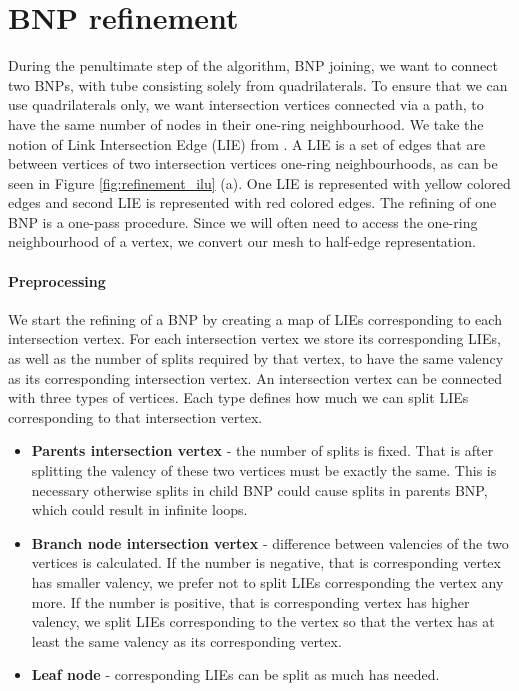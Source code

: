 \section{BNP refinement}\label{sec:bnp_sub}
During the penultimate step of the algorithm, BNP joining, we want to connect two BNPs, with tube consisting solely from quadrilaterals. To ensure that we can use quadrilaterals only, we want intersection vertices connected via a path, to have the same number of nodes in their one-ring neighbourhood. We take the notion of Link Intersection Edge (LIE) from \cite{sqm}. A LIE is a set of edges that are between vertices of two intersection vertices one-ring neighbourhoods, as can be seen in Figure \ref{fig:refinement_ilu} (a). One LIE is represented with yellow colored edges and second LIE is represented with red colored edges. The refining of one BNP is a one-pass procedure. Since we will often need to access the one-ring neighbourhood of a vertex, we convert our mesh to half-edge representation.

\paragraph{Preprocessing}
We start the refining of a BNP by creating a map of LIEs corresponding to each intersection vertex. For each intersection vertex we store its corresponding LIEs, as well as the number of splits required by that vertex, to have the same valency as its corresponding intersection vertex. An intersection vertex can be connected with three types of vertices. Each type defines how much we can split LIEs corresponding to that intersection vertex.
\begin{itemize}
	\itemsep-0.25em 
	\item \textbf{Parents intersection vertex} - the number of splits is fixed. That is after splitting the valency of these two vertices must be exactly the same. This is necessary otherwise splits in child BNP could cause splits in parents BNP, which could result in infinite loops.
	\item \textbf{Branch node intersection vertex} - difference between valencies of the two vertices is calculated. If the number is negative, that is corresponding vertex has smaller valency, we prefer not to split LIEs corresponding the vertex any more. If the number is positive, that is corresponding vertex has higher valency, we split LIEs corresponding to the vertex so that the vertex has at least the same valency as its corresponding vertex.
	\item \textbf{Leaf node} - corresponding LIEs can be split as much has needed.
\end{itemize}

